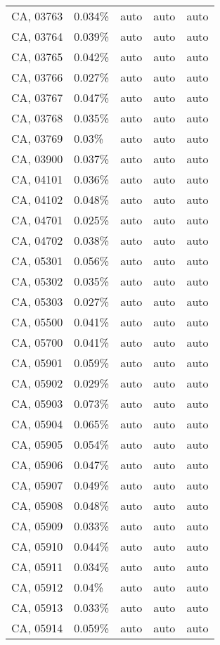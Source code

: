 \begin{longtable}[]{@{}lllll@{}}
CA, 03763 & 0.034\% & auto & auto & auto \\
CA, 03764 & 0.039\% & auto & auto & auto \\
CA, 03765 & 0.042\% & auto & auto & auto \\
CA, 03766 & 0.027\% & auto & auto & auto \\
CA, 03767 & 0.047\% & auto & auto & auto \\
CA, 03768 & 0.035\% & auto & auto & auto \\
CA, 03769 & 0.03\% & auto & auto & auto \\
CA, 03900 & 0.037\% & auto & auto & auto \\
CA, 04101 & 0.036\% & auto & auto & auto \\
CA, 04102 & 0.048\% & auto & auto & auto \\
CA, 04701 & 0.025\% & auto & auto & auto \\
CA, 04702 & 0.038\% & auto & auto & auto \\
CA, 05301 & 0.056\% & auto & auto & auto \\
CA, 05302 & 0.035\% & auto & auto & auto \\
CA, 05303 & 0.027\% & auto & auto & auto \\
CA, 05500 & 0.041\% & auto & auto & auto \\
CA, 05700 & 0.041\% & auto & auto & auto \\
CA, 05901 & 0.059\% & auto & auto & auto \\
CA, 05902 & 0.029\% & auto & auto & auto \\
CA, 05903 & 0.073\% & auto & auto & auto \\
CA, 05904 & 0.065\% & auto & auto & auto \\
CA, 05905 & 0.054\% & auto & auto & auto \\
CA, 05906 & 0.047\% & auto & auto & auto \\
CA, 05907 & 0.049\% & auto & auto & auto \\
CA, 05908 & 0.048\% & auto & auto & auto \\
CA, 05909 & 0.033\% & auto & auto & auto \\
CA, 05910 & 0.044\% & auto & auto & auto \\
CA, 05911 & 0.034\% & auto & auto & auto \\
CA, 05912 & 0.04\% & auto & auto & auto \\
CA, 05913 & 0.033\% & auto & auto & auto \\
CA, 05914 & 0.059\% & auto & auto & auto \\

\end{longtable}
